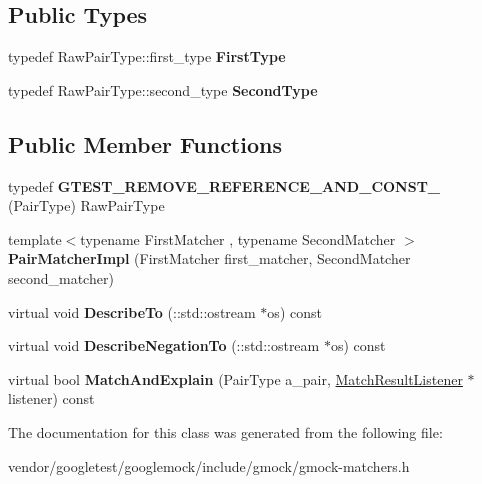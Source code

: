 \subsection*{Public Types}
\begin{DoxyCompactItemize}
\item 
\mbox{\label{classtesting_1_1internal_1_1_pair_matcher_impl_a9de66d76f0ebb0f107a9c18903b03176}} 
typedef Raw\+Pair\+Type\+::first\+\_\+type {\bfseries First\+Type}
\item 
\mbox{\label{classtesting_1_1internal_1_1_pair_matcher_impl_ad63c9ff4f1aff81562efca293ff5aca9}} 
typedef Raw\+Pair\+Type\+::second\+\_\+type {\bfseries Second\+Type}
\end{DoxyCompactItemize}
\subsection*{Public Member Functions}
\begin{DoxyCompactItemize}
\item 
\mbox{\label{classtesting_1_1internal_1_1_pair_matcher_impl_aa035224a7b73b2af1d1d27226a479241}} 
typedef {\bfseries G\+T\+E\+S\+T\+\_\+\+R\+E\+M\+O\+V\+E\+\_\+\+R\+E\+F\+E\+R\+E\+N\+C\+E\+\_\+\+A\+N\+D\+\_\+\+C\+O\+N\+S\+T\+\_\+} (Pair\+Type) Raw\+Pair\+Type
\item 
\mbox{\label{classtesting_1_1internal_1_1_pair_matcher_impl_ae2615e785df46255c8695a5972ca510a}} 
{\footnotesize template$<$typename First\+Matcher , typename Second\+Matcher $>$ }\\{\bfseries Pair\+Matcher\+Impl} (First\+Matcher first\+\_\+matcher, Second\+Matcher second\+\_\+matcher)
\item 
\mbox{\label{classtesting_1_1internal_1_1_pair_matcher_impl_ad4b5139aa8a3cdcc178c9d81b98d95f0}} 
virtual void {\bfseries Describe\+To} (\+::std\+::ostream $\ast$os) const
\item 
\mbox{\label{classtesting_1_1internal_1_1_pair_matcher_impl_a41ef8b1ae031cf342a380e2f2fb2a526}} 
virtual void {\bfseries Describe\+Negation\+To} (\+::std\+::ostream $\ast$os) const
\item 
\mbox{\label{classtesting_1_1internal_1_1_pair_matcher_impl_a1bba47f97cbf50a1f6331d3f7bfd47a1}} 
virtual bool {\bfseries Match\+And\+Explain} (Pair\+Type a\+\_\+pair, \hyperlink{classtesting_1_1_match_result_listener}{Match\+Result\+Listener} $\ast$listener) const
\end{DoxyCompactItemize}


The documentation for this class was generated from the following file\+:\begin{DoxyCompactItemize}
\item 
vendor/googletest/googlemock/include/gmock/gmock-\/matchers.\+h\end{DoxyCompactItemize}
